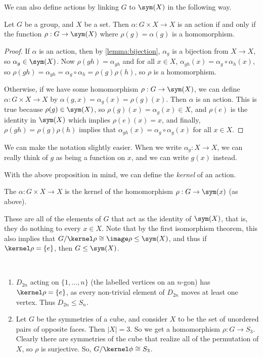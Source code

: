 \documentclass[a4paper]{scrartcl}
\begin{document}
We can also define actions by linking $G$ to $\sym(X)$ in the following way.

\begin{proposition}
	Let $G$ be a group, and $X$ be a set. Then $\alpha: G \times X \rightarrow X$ is an action if and only if the function $\rho: G \rightarrow \sym(X)$ where $\rho(g) = \alpha(g)$ is a homomorphism.
\end{proposition}
\begin{proof}
	If $\alpha$ is an action, then by \autoref{lemma:bijection}, $\alpha_g$ is a bijection from $X \rightarrow X$, so $\alpha_g \in \sym(X)$. Now $\rho(gh) = \alpha_{gh}$ and for all $x \in X$, $\alpha_{gh}(x) = \alpha_g \circ \alpha_h (x)$, so $\rho(gh) = \alpha_{gh} = \alpha_g \circ \alpha_h = \rho(g) \rho(h)$, so $\rho$ is a homomorphism.

	Otherwise, if we have some homomorphism $\rho : G \rightarrow \sym(X)$, we can define $\alpha: G \times X \rightarrow X$ by $\alpha(g, x) = \alpha_g(x)  = \rho(g)(x)$. Then $\alpha$ is an action. This is true because $\rho(g) \in \sym(X)$, so $\rho(g)(x) = \alpha_g(x) \in X$, and $\rho(e)$ is the identity in $\sym(X)$ which implies $\rho(e)(x) = x$, and finally, $\rho(gh) = \rho(g) \rho(h)$ implies that $\alpha_{gh}(x) = \alpha_g \circ \alpha_g (x)$ for all $x \in X$.   
\end{proof}

We can make the notation slightly easier. When we write $\alpha_g : X \rightarrow X$, we can really think of $g$ as being a function on $x$, and we can write $g(x)$ instead.

With the above proposition in mind, we can define the \emph{kernel} of an action.

\begin{definition}
	The  $\alpha : G \times X \rightarrow X$ is the kernel of the homomorphism $\rho : G \rightarrow \sym(x)$ (as above).
\end{definition}
These are all of the elements of $G$ that act as the identity of $\sym(X)$, that is, they do nothing to every $x \in X$. Note that by the first isomorphism theorem, this also implies that $G/\kernel \rho \cong \image \rho \leq \sym(X)$, and thus if $\kernel \rho = \{e\}$, then $G \leq \sym(X)$.

\begin{example}~
	    \vspace*{-1.5\baselineskip}
	\begin{enumerate}[label=(\roman*)]
		\item $D_{2n}$ acting on $\{1, \dots, n\}$ (the labelled vertices on an $n$-gon) has $\kernel \rho = \{ e\}$, as every non-trivial element of $D_{2n}$ moves at least one vertex. Thus $D_{2n} \leq S_n$.
		\item Let $G$ be the symmetries of a cube, and consider $X$ to be the set of unordered pairs of opposite faces. Then $|X| = 3$. So we get a homomorphism $\rho : G \rightarrow S_3$. Clearly there are symmetries of the cube that realize all of the permutation of $X$, so $\rho$ is surjective. So, $G/\kernel \phi \cong S_3$.
	\end{enumerate}
\end{example}
\end{document}
